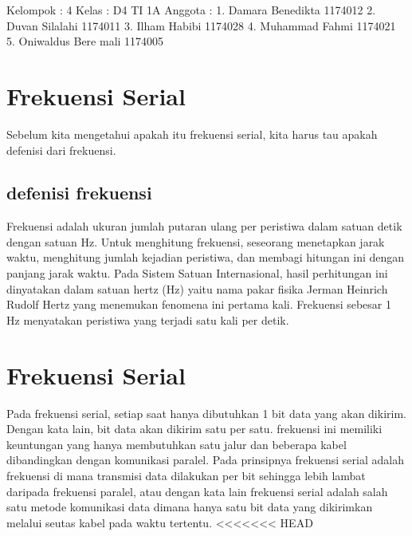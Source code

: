 Kelompok : 4
Kelas : D4 TI 1A
Anggota : 
1. Damara Benedikta		1174012
2. Duvan Silalahi 		1174011
3. Ilham Habibi			1174028
4. Muhammad Fahmi		1174021
5. Oniwaldus Bere mali	1174005

\section {Frekuensi Serial}
Sebelum kita mengetahui apakah itu frekuensi serial, kita harus tau apakah defenisi dari frekuensi.
\subsection  {defenisi frekuensi}
Frekuensi adalah ukuran jumlah putaran ulang per peristiwa dalam satuan detik dengan satuan Hz.
Untuk menghitung frekuensi, seseorang menetapkan jarak waktu, menghitung jumlah kejadian peristiwa, dan membagi hitungan ini dengan panjang jarak waktu. Pada Sistem Satuan Internasional, hasil perhitungan ini dinyatakan dalam satuan hertz (Hz) yaitu nama pakar fisika Jerman Heinrich Rudolf Hertz yang menemukan fenomena ini pertama kali. Frekuensi sebesar 1 Hz menyatakan peristiwa yang terjadi satu kali per detik.
\section {Frekuensi Serial}
Pada frekuensi serial, setiap saat hanya dibutuhkan 1 bit data yang akan dikirim. Dengan kata lain, bit data akan dikirim satu per satu. frekuensi ini memiliki keuntungan yang hanya membutuhkan satu jalur dan beberapa kabel dibandingkan dengan komunikasi paralel. Pada prinsipnya frekuensi serial adalah frekuensi di mana transmisi data dilakukan per bit sehingga lebih lambat daripada frekuensi paralel, atau dengan kata lain frekuensi serial adalah salah satu metode komunikasi data dimana hanya satu bit data yang dikirimkan melalui seutas kabel pada waktu tertentu.
<<<<<<< HEAD

